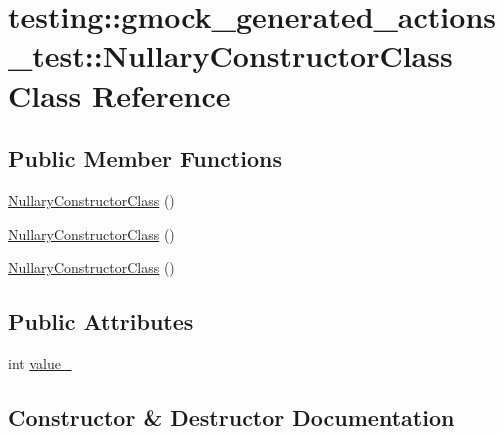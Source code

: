 \hypertarget{classtesting_1_1gmock__generated__actions__test_1_1_nullary_constructor_class}{}\section{testing\+::gmock\+\_\+generated\+\_\+actions\+\_\+test\+::Nullary\+Constructor\+Class Class Reference}
\label{classtesting_1_1gmock__generated__actions__test_1_1_nullary_constructor_class}
\subsection*{Public Member Functions}
\begin{DoxyCompactItemize}
\item 
\mbox{\hyperlink{classtesting_1_1gmock__generated__actions__test_1_1_nullary_constructor_class_a8ad709e8d6c391958907dafea12d38a2}{Nullary\+Constructor\+Class}} ()
\item 
\mbox{\hyperlink{classtesting_1_1gmock__generated__actions__test_1_1_nullary_constructor_class_a8ad709e8d6c391958907dafea12d38a2}{Nullary\+Constructor\+Class}} ()
\item 
\mbox{\hyperlink{classtesting_1_1gmock__generated__actions__test_1_1_nullary_constructor_class_a8ad709e8d6c391958907dafea12d38a2}{Nullary\+Constructor\+Class}} ()
\end{DoxyCompactItemize}
\subsection*{Public Attributes}
\begin{DoxyCompactItemize}
\item 
int \mbox{\hyperlink{classtesting_1_1gmock__generated__actions__test_1_1_nullary_constructor_class_aa877ccc5aff335cbf81b8de90abee732}{value\+\_\+}}
\end{DoxyCompactItemize}


\subsection{Constructor \& Destructor Documentation}
\mbox{\label{classtesting_1_1gmock__generated__actions__test_1_1_nullary_constructor_class_a8ad709e8d6c391958907dafea12d38a2}} 
